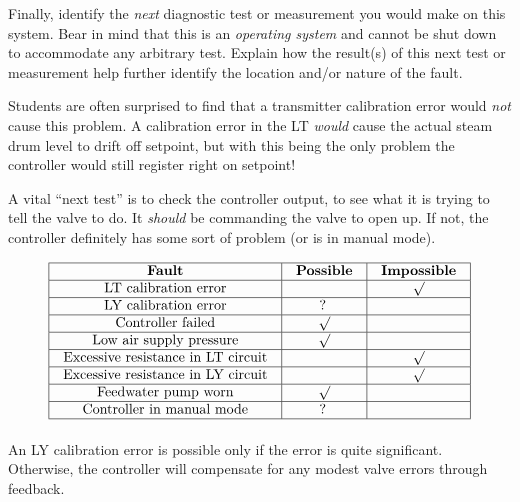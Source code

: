 Finally, identify the {\it next} diagnostic test or measurement you would make on this system.  Bear in mind that this is an {\it operating system} and cannot be shut down to accommodate any arbitrary test.  Explain how the result(s) of this next test or measurement help further identify the location and/or nature of the fault.







Students are often surprised to find that a transmitter calibration error would {\it not} cause this problem.  A calibration error in the LT {\it would} cause the actual steam drum level to drift off setpoint, but with this being the only problem the controller would still register right on setpoint!

\vskip 10pt

A vital ``next test'' is to check the controller output, to see what it is trying to tell the valve to do.  It {\it should} be commanding the valve to open up.  If not, the controller definitely has some sort of problem (or is in manual mode).








$$\vbox{\offinterlineskip
\halign{\strut
\vrule \quad\hfil # \ \hfil & 
\vrule \quad\hfil # \ \hfil & 
\vrule \quad\hfil # \ \hfil \vrule \cr
\noalign{\hrule}
%
{\bf Fault} & {\bf Possible} & {\bf Impossible} \cr
%
\noalign{\hrule}
%
LT calibration error &  & $\surd$ \cr
%
\noalign{\hrule}
%
LY calibration error & ? &  \cr
%
\noalign{\hrule}
%
Controller failed & $\surd$ &  \cr
%
\noalign{\hrule}
%
Low air supply pressure & $\surd$ &  \cr
%
\noalign{\hrule}
%
Excessive resistance in LT circuit &  & $\surd$ \cr
%
\noalign{\hrule}
%
Excessive resistance in LY circuit &  & $\surd$ \cr
%
\noalign{\hrule}
%
Feedwater pump worn & $\surd$ &  \cr
%
\noalign{\hrule}
%
Controller in manual mode & ? &  \cr
%
\noalign{\hrule}
} %
}$$ %

An LY calibration error is possible only if the error is quite significant.  Otherwise, the controller will compensate for any modest valve errors through feedback.

